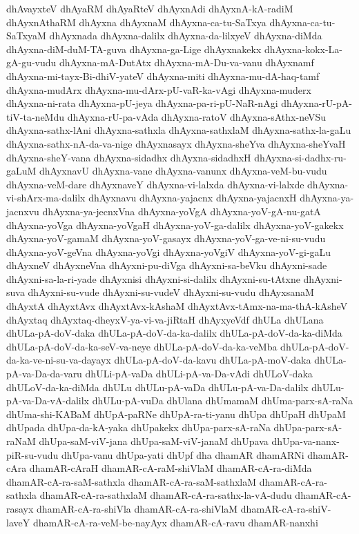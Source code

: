 {dhAvayxteV
dhAyaRM
dhAyaRteV
dhAyxnAdi
dhAyxnA-kA-radiM
dhAyxnAthaRM
dhAyxna
dhAyxnaM
dhAyxna-ca-tu-SaTxya
dhAyxna-ca-tu-SaTxyaM
dhAyxnada
dhAyxna-dalilx
dhAyxna-da-lilxyeV
dhAyxna-diMda
dhAyxna-diM-duM-TA-guva
dhAyxna-ga-Lige
dhAyxnakekx
dhAyxna-kokx-La-gA-gu-vudu
dhAyxna-mA-DutAtx
dhAyxna-mA-Du-va-vanu
dhAyxnamf
dhAyxna-mi-tayx-Bi-dhiV-yateV
dhAyxna-miti
dhAyxna-mu-dA-haq-tamf
dhAyxna-mudArx
dhAyxna-mu-dArx-pU-vaR-ka-vAgi
dhAyxna-muderx
dhAyxna-ni-rata
dhAyxna-pU-jeya
dhAyxna-pa-ri-pU-NaR-nAgi
dhAyxna-rU-pA-tiV-ta-neMdu
dhAyxna-rU-pa-vAda
dhAyxna-ratoV
dhAyxna-sAthx-neVSu
dhAyxna-sathx-lAni
dhAyxna-sathxla
dhAyxna-sathxlaM
dhAyxna-sathx-la-gaLu
dhAyxna-sathx-nA-da-va-nige
dhAyxnasayx
dhAyxna-sheYva
dhAyxna-sheYvaH
dhAyxna-sheY-vana
dhAyxna-sidadhx
dhAyxna-sidadhxH
dhAyxna-si-dadhx-ru-gaLuM
dhAyxnavU
dhAyxna-vane
dhAyxna-vanunx
dhAyxna-veM-bu-vudu
dhAyxna-veM-dare
dhAyxnaveY
dhAyxna-vi-lalxda
dhAyxna-vi-lalxde
dhAyxna-vi-shArx-ma-dalilx
dhAyxnavu
dhAyxna-yajacnx
dhAyxna-yajacnxH
dhAyxna-ya-jacnxvu
dhAyxna-ya-jecnxVna
dhAyxna-yoVgA
dhAyxna-yoV-gA-nu-gatA
dhAyxna-yoVga
dhAyxna-yoVgaH
dhAyxna-yoV-ga-dalilx
dhAyxna-yoV-gakekx
dhAyxna-yoV-gamaM
dhAyxna-yoV-gasayx
dhAyxna-yoV-ga-ve-ni-su-vudu
dhAyxna-yoV-geVna
dhAyxna-yoVgi
dhAyxna-yoVgiV
dhAyxna-yoV-gi-gaLu
dhAyxneV
dhAyxneVna
dhAyxni-pu-diVga
dhAyxni-sa-beVku
dhAyxni-sade
dhAyxni-sa-la-ri-yade
dhAyxnisi
dhAyxni-si-dalilx
dhAyxni-su-tAtxne
dhAyxni-suva
dhAyxni-su-vude
dhAyxni-su-vudeV
dhAyxni-su-vudu
dhAyxsanaM
dhAyxtA
dhAyxtAvx
dhAyxtAvx-kAshaM
dhAyxtAvx-tAmx-na-ma-thA-kAsheV
dhAyxtaq
dhAyxtaq-dheyxV-ya-vi-va-jiRtaH
dhAyxyeVdf
dhULa
dhULana
dhULa-pA-doV-daka
dhULa-pA-doV-da-ka-dalilx
dhULa-pA-doV-da-ka-diMda
dhULa-pA-doV-da-ka-seV-va-neye
dhULa-pA-doV-da-ka-veMba
dhULa-pA-doV-da-ka-ve-ni-su-va-dayayx
dhULa-pA-doV-da-kavu
dhULa-pA-moV-daka
dhULa-pA-va-Da-da-varu
dhULi-pA-vaDa
dhULi-pA-va-Da-vAdi
dhULoV-daka
dhULoV-da-ka-diMda
dhULu
dhULu-pA-vaDa
dhULu-pA-va-Da-dalilx
dhULu-pA-va-Da-vA-dalilx
dhULu-pA-vuDa
dhUlana
dhUmamaM
dhUma-parx-sA-raNa
dhUma-shi-KABaM
dhUpA-paRNe
dhUpA-ra-ti-yanu
dhUpa
dhUpaH
dhUpaM
dhUpada
dhUpa-da-kA-yaka
dhUpakekx
dhUpa-parx-sA-raNa
dhUpa-parx-sA-raNaM
dhUpa-saM-viV-jana
dhUpa-saM-viV-janaM
dhUpava
dhUpa-va-nanx-piR-su-vudu
dhUpa-vanu
dhUpa-yati
dhUpf
dha
dhamAR
dhamARNi
dhamAR-cAra
dhamAR-cAraH
dhamAR-cA-raM-shiVlaM
dhamAR-cA-ra-diMda
dhamAR-cA-ra-saM-sathxla
dhamAR-cA-ra-saM-sathxlaM
dhamAR-cA-ra-sathxla
dhamAR-cA-ra-sathxlaM
dhamAR-cA-ra-sathx-la-vA-dudu
dhamAR-cA-rasayx
dhamAR-cA-ra-shiVla
dhamAR-cA-ra-shiVlaM
dhamAR-cA-ra-shiV-laveY
dhamAR-cA-ra-veM-be-nayAyx
dhamAR-cA-ravu
dhamAR-nanxhi
}
